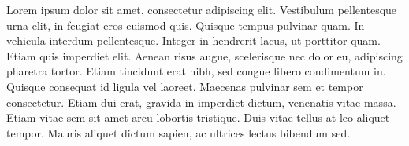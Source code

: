\documentclass{ximera}
\begin{document}
\begin{criterion}Lorem ipsum dolor sit amet, consectetur adipiscing elit. Vestibulum pellentesque urna elit, in feugiat eros euismod quis. Quisque tempus pulvinar quam. In vehicula interdum pellentesque. Integer in hendrerit lacus, ut porttitor quam. Etiam quis imperdiet elit. Aenean risus augue, scelerisque nec dolor eu, adipiscing pharetra tortor. Etiam tincidunt erat nibh, sed congue libero condimentum in. Quisque consequat id ligula vel laoreet. Maecenas pulvinar sem et tempor consectetur. Etiam dui erat, gravida in imperdiet dictum, venenatis vitae massa. Etiam vitae sem sit amet arcu lobortis tristique. Duis vitae tellus at leo aliquet tempor. Mauris aliquet dictum sapien, ac ultrices lectus bibendum sed.\end{criterion}
\end{document}
